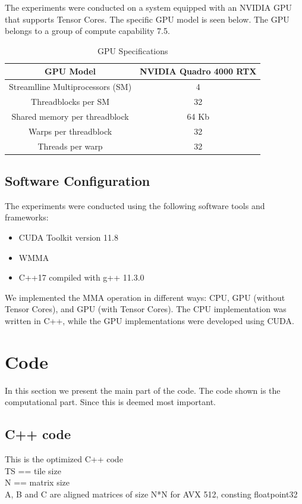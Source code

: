 \documentclass[conference]{IEEEtran}
\begin{document}
  The experiments were conducted on a system equipped with an NVIDIA GPU that supports Tensor Cores.
  The specific GPU model is seen below. The GPU belongs to a group of compute capability 7.5. 
  
  \begin{table}[htbp]
  \caption{GPU Specifications\cite{Voltatuningguide}}
  \centering
    \begin{tabular}{|c|c|}
    \hline
    GPU Model & NVIDIA Quadro 4000 RTX \\
    \hline
    Streamlline Multiprocessors (SM) & 4 \\
    \hline
    Threadblocks per SM & 32 \\
    \hline
    Shared memory per threadblock & 64 Kb \\
    \hline
    Warps per threadblock & 32 \\
    \hline
    Threads per warp & 32 \\
    \hline
  \end{tabular}
  \end{table}
  
  \subsection{Software Configuration}\label{sec:software-configuration}
  
  The experiments were conducted using the following software tools and frameworks:
  
  \begin{itemize}
    \item CUDA Toolkit version 11.8
    \item WMMA
    \item C++17 compiled with g++ 11.3.0
  \end{itemize}
  
  We implemented the MMA operation in different ways: CPU, GPU (without Tensor Cores), and GPU (with Tensor Cores). 
  The CPU implementation was written in C++, while the GPU implementations were developed using CUDA.

  
  \section{Code}
  In this section we present the main part of the code. The code shown is the computational part. Since this is
  deemed most important.

  \subsection{C++ code}\label{sec:CppCode}
  This is the optimized C++ code\\
  TS == tile size \\
  N == matrix size \\
  A, B and C are aligned matrices of size N*N for AVX 512, consting floatpoint32 
  
\end{document}
